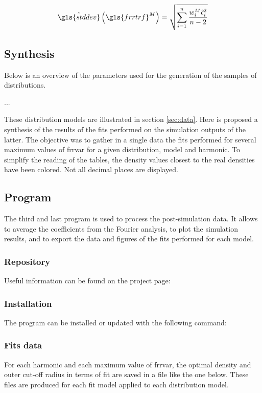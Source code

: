 \begin{equation}\label{eq:fit-standard-error}
\hat{\gls{stddev}} \left( \gls{frrtrf}^M \right) = \sqrt{\sum_{i=1}^n \frac{w^M_i\hat{\epsilon}_i^2}{n-2}}
\end{equation}

\subsection{Synthesis}\label{sec:synthesis}

Below is an overview of the parameters used for the generation of the samples of distributions.

...

\bigskip

These distribution models are illustrated in section \ref{sec:data}.
Here is proposed a synthesis of the results of the fits performed on the simulation outputs of the latter.
The objective was to gather in a single data the fits performed for several maximum values of \gls{frrvar} for a given distribution, model and harmonic.
To simplify the reading of the tables, the density values closest to the real densities have been colored.
Not all decimal places are displayed.



\subsection{Program}

The third and last program is used to process the post-simulation data.
It allows to average the coefficients from the Fourier analysis, to plot the simulation results, and to export the data and figures of the fits performed for each model.

\subsubsection{Repository}

Useful information can be found on the project page: 

\subsubsection{Installation}

The program can be installed or updated with the following command:


\subsubsection{Fits data}

For each harmonic and each maximum value of \gls{frrvar}, the optimal density and outer cut-off radius in terms of fit are saved in a file like the one below. These files are produced for each fit model applied to each distribution model.

\medskip


